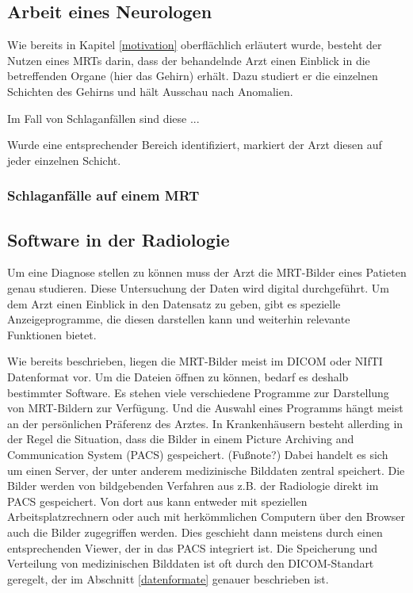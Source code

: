 \subsection{Arbeit eines Neurologen}
Wie bereits in Kapitel \ref{motivation} oberflächlich erläutert wurde, besteht der Nutzen eines MRTs darin, dass der behandelnde Arzt einen Einblick in die betreffenden Organe (hier das Gehirn) erhält. Dazu studiert er die einzelnen Schichten des Gehirns und hält Ausschau nach Anomalien.

Im Fall von Schlaganfällen sind diese ...

Wurde eine entsprechender Bereich identifiziert, markiert der Arzt diesen auf jeder einzelnen Schicht. 
\subsubsection{Schlaganfälle auf einem MRT}

\subsection{Software in der Radiologie}
Um eine Diagnose stellen zu können muss der Arzt die MRT-Bilder eines Patieten genau studieren. Diese Untersuchung der Daten wird digital durchgeführt. Um dem Arzt einen Einblick in den Datensatz zu geben, gibt es spezielle Anzeigeprogramme, die diesen darstellen kann und weiterhin relevante Funktionen bietet. 
  
Wie bereits beschrieben, liegen die MRT-Bilder meist im DICOM oder NIfTI Datenformat vor. Um die Dateien öffnen zu können, bedarf es deshalb bestimmter Software. Es stehen viele verschiedene Programme zur Darstellung von MRT-Bildern zur Verfügung. Und die Auswahl eines Programms hängt meist an der persönlichen Präferenz des Arztes. 
In Krankenhäusern besteht allerding in der Regel die Situation, dass die Bilder in einem Picture Archiving and Communication System (PACS) gespeichert. (Fußnote?) Dabei handelt es sich um einen Server, der unter anderem medizinische Bilddaten zentral speichert. Die Bilder werden von bildgebenden Verfahren aus z.B. der Radiologie direkt im PACS gespeichert. Von dort aus kann entweder mit speziellen Arbeitsplatzrechnern oder auch mit herkömmlichen Computern über den Browser auch die Bilder zugegriffen werden. Dies geschieht dann meistens durch einen entsprechenden Viewer, der in das PACS integriert ist. Die Speicherung und Verteilung von medizinischen Bilddaten ist oft durch den DICOM-Standart geregelt, der im Abschnitt \ref{datenformate} genauer beschrieben ist.

